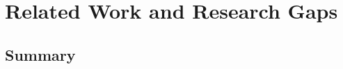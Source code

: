 
\cleardoublepage\chapter{Related Work and Research Gaps}\minitoc\label{sec:relatedwork}\vspace{.5cm}
\noindent\lipsum[7]

\section{Summary}
\lipsum[5]
